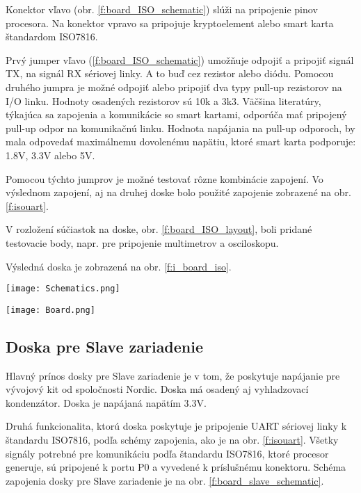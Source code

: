 \documentclass[12pt,a4paper,oneside,openright]{report}
\begin{document}
	Konektor vľavo (obr. \ref{f:board_ISO_schematic}) slúži na pripojenie pinov procesora. Na konektor vpravo sa pripojuje kryptoelement alebo smart karta štandardom ISO7816.
	
	Prvý jumper vľavo (\ref{f:board_ISO_schematic})  umožňuje odpojiť a pripojiť signál TX, na signál RX sériovej linky. A to buď cez rezistor alebo diódu.
	Pomocou druhého jumpra je možné odpojiť alebo pripojiť dva typy pull-up rezistorov na I/O linku. Hodnoty osadených rezistorov sú 10k a 3k3. 
	Väčšina literatúry, týkajúca sa zapojenia a komunikácie so smart kartami, odporúča mať pripojený  pull-up odpor na komunikačnú linku. Hodnota napájania na pull-up odporoch, by mala odpovedať maximálnemu dovolenému napätiu, ktoré smart karta podporuje: 1.8V, 3.3V alebo 5V.
	
	Pomocou týchto jumprov je možné testovať rôzne kombinácie zapojení. Vo výslednom zapojení, aj na druhej doske bolo použité zapojenie zobrazené na obr. \ref{f:isouart}.
	
	 V rozložení súčiastok na doske, obr. \ref{f:board_ISO_layout}, boli pridané testovacie body, napr. pre pripojenie multimetrov a osciloskopu.
	
	Výsledná doska je zobrazená na obr.  \ref{f:i_board_iso}.
	
	\begin{figure*}[!htb]
		\centering
		\texttt{[image: Schematics.png]}
		\caption{Testovacia doska pre konverziu UART na štandard ISO7816.}
		\label{f:board_ISO_schematic}
	\end{figure*}
	
	\begin{figure*}[!htb]
		\centering
		\texttt{[image: Board.png]}
		\caption{Rozloženie súčiastok na doske plošných spojov.}
		\label{f:board_ISO_layout}
	\end{figure*}
	
	\subsection{Doska pre Slave zariadenie} \label{slaveboard}

	Hlavný prínos dosky pre Slave zariadenie je v tom, že poskytuje napájanie pre vývojový kit od spoločnosti Nordic. Doska má osadený aj vyhladzovací kondenzátor.
	Doska je napájaná napätím 3.3V.
	
	Druhá funkcionalita, ktorú doska poskytuje je pripojenie UART sériovej linky k štandardu ISO7816, podľa schémy zapojenia, ako je na obr. \ref{f:isouart}. Všetky signály potrebné pre komunikáciu podľa štandardu ISO7816, ktoré procesor generuje, sú pripojené k portu P0 a vyvedené k príslušnému konektoru.
	Schéma zapojenia dosky pre Slave zariadenie je na obr. \ref{f:board_slave_schematic}. 
	
\end{document}
